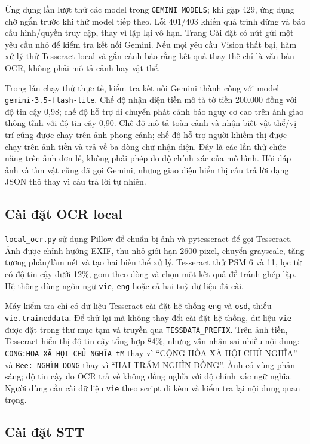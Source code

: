 Ứng dụng lần lượt thử các model trong \texttt{GEMINI\_MODELS}; khi gặp 429,
ứng dụng chờ ngắn trước khi thử model tiếp theo. Lỗi 401/403 khiến quá trình
dừng và báo cấu hình/quyền truy cập, thay vì lặp lại vô hạn. Trang Cài đặt có
nút gửi một yêu cầu nhỏ để kiểm tra kết nối Gemini. Nếu mọi yêu cầu Vision
thất bại, hàm xử lý thử Tesseract local và gắn cảnh báo rằng kết quả thay thế
chỉ là văn bản OCR, không phải mô tả cảnh hay vật thể.

Trong lần chạy thử thực tế, kiểm tra kết nối Gemini thành công với model
\texttt{gemini-3.5-flash-lite}. Chế độ nhận diện tiền mô tả tờ tiền 200.000
đồng với độ tin cậy 0,98; chế độ hỗ trợ di chuyển phát cảnh báo nguy cơ cao
trên ảnh giao thông tĩnh với độ tin cậy 0,90. Chế độ mô tả toàn cảnh và nhận
biết vật thể/vị trí cũng được chạy trên ảnh phong cảnh; chế độ hỗ trợ người
khiếm thị được chạy trên ảnh tiền và trả về ba dòng chữ nhận diện. Đây là các
lần thử chức năng trên ảnh đơn lẻ, không phải phép đo độ chính xác của mô hình.
Hỏi đáp ảnh và tìm vật cũng đã gọi Gemini, nhưng giao diện hiển thị câu trả
lời dạng JSON thô thay vì câu trả lời tự nhiên.

\subsection{Cài đặt OCR local}

\texttt{local\_ocr.py} sử dụng Pillow để chuẩn bị ảnh và pytesseract để gọi Tesseract.
Ảnh được chỉnh hướng EXIF, thu nhỏ giới hạn 2600 pixel, chuyển grayscale,
tăng tương phản/làm nét và tạo hai biến thể xử lý. Tesseract thử PSM 6 và 11,
lọc từ có độ tin cậy dưới 12\%, gom theo dòng và chọn một kết quả để tránh
ghép lặp. Hệ thống dùng ngôn ngữ \texttt{vie}, \texttt{eng} hoặc cả hai tuỳ dữ
liệu đã cài.

Máy kiểm tra chỉ có dữ liệu Tesseract cài đặt hệ thống \texttt{eng} và
\texttt{osd}, thiếu \texttt{vie.traineddata}. Để thử lại mà không thay đổi cài
đặt hệ thống, dữ liệu \texttt{vie} được đặt trong thư mục tạm và truyền qua
\texttt{TESSDATA\_PREFIX}. Trên ảnh tiền, Tesseract hiển thị độ tin cậy tổng
hợp 84\%, nhưng vẫn nhận sai nhiều nội dung: \texttt{CONG:HOA XÃ HỘI CHỦ NGHĨA
tM} thay vì ``CỘNG HÒA XÃ HỘI CHỦ NGHĨA'' và \texttt{Bee: NGHÌN DONG} thay
vì ``HAI TRĂM NGHÌN ĐỒNG''. Ảnh có vùng phản sáng; độ tin cậy do OCR trả về
không đồng nghĩa với độ chính xác ngữ nghĩa. Người dùng cần cài dữ liệu
\texttt{vie} theo script đi kèm và kiểm tra lại nội dung quan trọng.

\subsection{Cài đặt STT}

